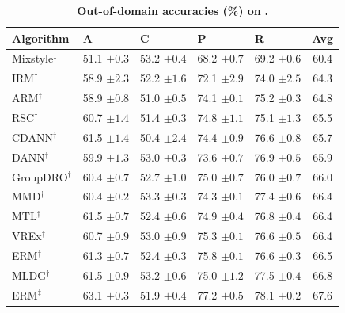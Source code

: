 \begin{table}[htbp]
\centering
\small
\renewcommand{\arraystretch}{1.1}
\caption{\textbf{Out-of-domain accuracies (\%) on} \textbf{.}}
\begin{tabular}{lllll|c}
\toprule
\textbf{Algorithm} & \textbf{A} & \textbf{C} & \textbf{P} & \textbf{R} & \textbf{Avg} \\
\midrule
Mixstyle$^\ddagger$ & 51.1 \scriptsize$\pm0.3$ & 53.2 \scriptsize$\pm0.4$ & 68.2 \scriptsize$\pm0.7$ & 69.2 \scriptsize$\pm0.6$ & 60.4 \\
IRM$^\dagger$ & 58.9 \scriptsize$\pm2.3$ & 52.2 \scriptsize$\pm1.6$ & 72.1 \scriptsize$\pm2.9$ & 74.0 \scriptsize$\pm2.5$ & 64.3 \\
ARM$^\dagger$ & 58.9 \scriptsize$\pm0.8$ & 51.0 \scriptsize$\pm0.5$ & 74.1 \scriptsize$\pm0.1$ & 75.2 \scriptsize$\pm0.3$ & 64.8 \\
RSC$^\dagger$ & 60.7 \scriptsize$\pm1.4$ & 51.4 \scriptsize$\pm0.3$ & 74.8 \scriptsize$\pm1.1$ & 75.1 \scriptsize$\pm1.3$ & 65.5 \\
CDANN$^\dagger$ & 61.5 \scriptsize$\pm1.4$ & 50.4 \scriptsize$\pm2.4$ & 74.4 \scriptsize$\pm0.9$ & 76.6 \scriptsize$\pm0.8$ & 65.7 \\
DANN$^\dagger$ & 59.9 \scriptsize$\pm1.3$ & 53.0 \scriptsize$\pm0.3$ & 73.6 \scriptsize$\pm0.7$ & 76.9 \scriptsize$\pm0.5$ & 65.9 \\
GroupDRO$^\dagger$ & 60.4 \scriptsize$\pm0.7$ & 52.7 \scriptsize$\pm1.0$ & 75.0 \scriptsize$\pm0.7$ & 76.0 \scriptsize$\pm0.7$ & 66.0 \\
MMD$^\dagger$ & 60.4 \scriptsize$\pm0.2$ & 53.3 \scriptsize$\pm0.3$ & 74.3 \scriptsize$\pm0.1$ & 77.4 \scriptsize$\pm0.6$ & 66.4 \\
MTL$^\dagger$ & 61.5 \scriptsize$\pm0.7$ & 52.4 \scriptsize$\pm0.6$ & 74.9 \scriptsize$\pm0.4$ & 76.8 \scriptsize$\pm0.4$ & 66.4 \\
VREx$^\dagger$ & 60.7 \scriptsize$\pm0.9$ & 53.0 \scriptsize$\pm0.9$ & 75.3 \scriptsize$\pm0.1$ & 76.6 \scriptsize$\pm0.5$ & 66.4 \\
ERM$^\dagger$ & 61.3 \scriptsize$\pm0.7$ & 52.4 \scriptsize$\pm0.3$ & 75.8 \scriptsize$\pm0.1$ & 76.6 \scriptsize$\pm0.3$ & 66.5 \\
MLDG$^\dagger$ & 61.5 \scriptsize$\pm0.9$ & 53.2 \scriptsize$\pm0.6$ & 75.0 \scriptsize$\pm1.2$ & 77.5 \scriptsize$\pm0.4$ & 66.8 \\
ERM$^\ddagger$ & 63.1 \scriptsize$\pm0.3$ & 51.9 \scriptsize$\pm0.4$ & 77.2 \scriptsize$\pm0.5$ & 78.1 \scriptsize$\pm0.2$ & 67.6 \\

\end{tabular}
\end{table}
